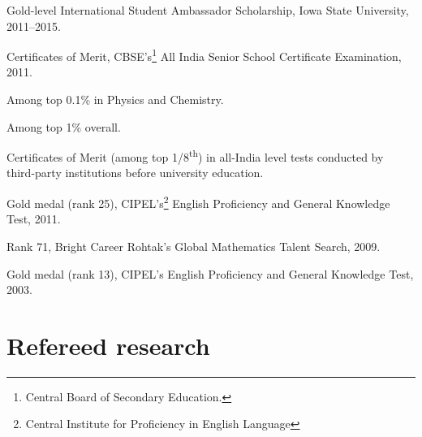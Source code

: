 \documentclass[11pt,article,oneside]{memoir}
\begin{document}
\begin{etaremune}
\normalsize

\item Gold-level International Student Ambassador Scholarship, Iowa State University, 2011--2015.

\item Certificates of Merit, CBSE's\footnote{Central Board of Secondary Education.} All India Senior School Certificate Examination, 2011.

\ind \hspace{0.35in} \footnotesize Among top 0.1\% in Physics and Chemistry.

\vspace{-0.5em}
\ind \hspace{0.35in} Among top 1\% overall.

\normalsize

\item Certificates of Merit (among top 1/8\textsuperscript{th}) in all-India level tests conducted by third-party institutions before university education.

	\ind \hspace{0.35in} \footnotesize Gold medal (rank 25), CIPEL's\footnote{Central Institute for Proficiency in English Language} English Proficiency and General Knowledge Test, 2011.
	
	\vspace{-0.25em}
	\ind \hspace{0.35in} Rank 71, Bright Career Rohtak's Global Mathematics Talent Search, 2009.
	
	\vspace{-0.25em}
	\ind \hspace{0.35in} Gold medal (rank 13), CIPEL's English Proficiency and General Knowledge Test, 2003.

\normalsize

\end{etaremune}

\def\labelprefix{J}

\section{Refereed research}

\medskip
\end{document}
